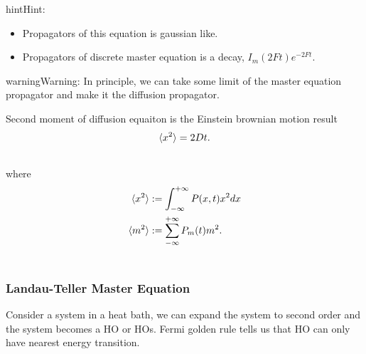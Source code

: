 \documentclass[letterpaper,10pt,english]{sphinxmanual}
\begin{document}
\begin{notice}{hint}{Hint:}\begin{itemize}
\item {} 
Propagators of this equation is gaussian like.

\item {} 
Propagators of discrete master equation is a decay, $I_m(2Ft)e^{-2Ft}$.

\end{itemize}
\end{notice}

\begin{notice}{warning}{Warning:}
In principle, we can take some limit of the master equation propagator and make it the diffusion propagator.
\end{notice}

Second moment of diffusion equaiton is the Einstein brownian motion result
\begin{gather}
\begin{split}\langle x^2 \rangle = 2 D t .\end{split}\notag\\\begin{split}\end{split}\notag
\end{gather}
where
\begin{gather}
\begin{split}\langle x^2\rangle &:= \int_{-\infty}^{+\infty} P(x,t) x^2 dx \\
\langle m^2 \rangle &:= \sum_{-\infty}^{+\infty} P_m(t) m^2  .\end{split}\notag\\\begin{split}\end{split}\notag
\end{gather}

\subsubsection{Landau-Teller Master Equation}
\label{nonequilibrium/week11:landau-teller-master-equation}
Consider a system in a heat bath, we can expand the system to second order and the system becomes a HO or HOs. Fermi golden rule tells us that HO can only have nearest energy transition.
\end{document}
